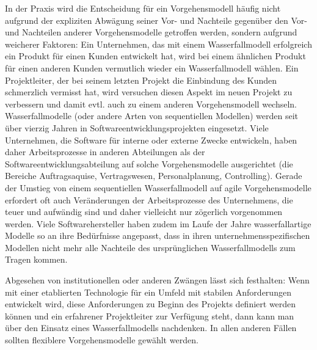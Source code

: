 In der Praxis wird die Entscheidung für ein Vorgehensmodell 
häufig nicht aufgrund der expliziten Abwägung seiner Vor- und Nachteile gegenüber den Vor- und Nachteilen anderer Vorgehensmodelle getroffen werden, sondern aufgrund weicherer Faktoren: Ein Unternehmen, das mit einem Wasserfallmodell erfolgreich ein Produkt für einen Kunden entwickelt hat, wird bei einem ähnlichen Produkt für einen anderen Kunden vermutlich wieder ein Wasserfallmodell wählen. Ein Projektleiter, der bei seinem letzten Projekt die Einbindung des Kunden schmerzlich vermisst hat, wird versuchen diesen Aspekt im neuen Projekt zu verbessern und damit evtl. auch zu einem anderen Vorgehensmodell wechseln. Wasserfallmodelle (oder andere Arten von sequentiellen Modellen) werden seit über vierzig Jahren in Soft\-ware\-entwick\-lungs\-projekten eingesetzt. Viele Unternehmen, die Software für interne oder externe Zwecke entwickeln, haben daher Arbeitsprozesse in anderen Abteilungen als der Softwareentwicklungsabteilung auf solche Vorgehensmodelle ausgerichtet (\zb die Bereiche Auftragsaquise, Vertragswesen, Personalplanung, Controlling). Gerade der Umstieg von einem sequentiellen Wasserfallmodell auf agile Vorgehensmodelle erfordert oft auch Veränderungen der Arbeitsprozesse des Unternehmens, die teuer und aufwändig sind und daher vielleicht nur zögerlich vorgenommen werden. Viele Softwarehersteller haben zudem im Laufe der Jahre wasserfallartige Modelle so an ihre Bedürfnisse angepasst, dass in ihren unternehmensspezifischen Modellen nicht mehr alle Nachteile des ursprünglichen Wasserfallmodells zum Tragen kommen.

Abgesehen von institutionellen oder anderen Zwängen lässt sich festhalten: Wenn mit einer etablierten Technologie für ein Umfeld mit stabilen Anforderungen entwickelt wird, diese Anforderungen zu Beginn des Projekts definiert werden können und ein erfahrener Projektleiter zur Verfügung steht, dann kann man über den Einsatz eines Was\-ser\-fall\-modells nachdenken. In allen anderen Fällen sollten flexiblere Vorgehensmodelle gewählt werden.
